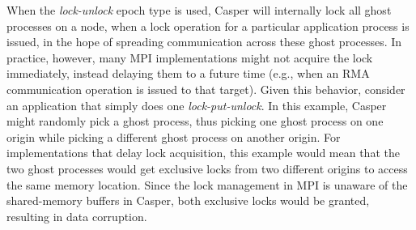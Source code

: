 When the \emph{lock-unlock} epoch type is used, Casper will internally
lock all ghost processes on a node, when a lock operation for a
particular application process is issued, in the hope of spreading
communication across these ghost processes.  In practice, however,
many MPI implementations might not acquire the lock immediately, instead
delaying them to a future time (e.g., when an RMA communication operation
is issued to that target).  Given this behavior, consider an
application that simply does one \emph{lock-put-unlock}.  In this
example, Casper might randomly pick a ghost process, thus picking one
ghost process on one origin while picking a different ghost process on
another origin.  For implementations that delay lock acquisition, this
example would mean that the two ghost processes would get exclusive locks from
two different origins to access the same memory location.  Since the
lock management in MPI is unaware of the shared-memory buffers in
Casper, both exclusive locks would be granted, resulting in data
corruption.





